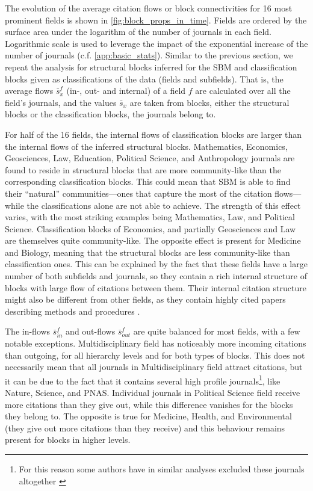\documentclass[a4paper,12pt]{article}
\begin{document}
The evolution of the average citation flows or block connectivities for 16 most prominent fields
is shown in \cref{fig:block_props_in_time}.
Fields are ordered by the surface area under the logarithm of the number of journals in each field.
Logarithmic scale is used to leverage the impact of the exponential increase of the number of journals (c.f. \cref{app:basic_stats}).
Similar to the previous section,
we repeat the analysis for structural blocks inferred for the SBM
and classification blocks given as classifications of the data (fields and subfields). That is, the average flows $\bar{s}^{f}_x$ (in-, out- and 
internal) of a field $f$ are calculated over all the field's journals, and the values $\bar{s}_x$ 
are taken from blocks,  either the structural blocks or the classification blocks, the journals belong to.

For half of the 16 fields, the internal flows of classification blocks are larger than the
internal flows of the inferred structural blocks.
Mathematics, Economics, Geosciences, Law, Education, Political Science, and Anthropology journals 
are found to reside in structural blocks that are more community-like than the corresponding classification blocks. This could mean that SBM is able to find their ``natural'' communities---ones 
that capture the most of the citation flows---while the classifications alone are not able to achieve.
The strength of this effect varies, with the most striking examples being Mathematics, Law, 
and Political Science. Classification blocks of Economics, and partially Geosciences and Law are 
themselves quite community-like.
The opposite effect is present for Medicine and Biology, meaning  that the structural blocks are less 
community-like than classification ones. 
This can be explained by the fact that these fields 
have a large number of both subfields and journals, so they contain a rich internal 
structure of blocks with large flow of citations between them.
Their internal citation structure might also be different from other fields, as they
contain highly cited papers describing methods and procedures \citep{Small1974}.

The in-flows $\bar{s}^{f}_{in}$ and out-flows $\bar{s}^{f}_{out}$ are quite balanced for most fields, with a few notable exceptions. 
Multidisciplinary field has noticeably more incoming citations than outgoing, for all hierarchy levels and for both types of blocks.
This does not necessarily mean that all journals in Multidisciplinary field attract 
citations, but it can be due to the fact that it contains several high profile
journals\footnote{For this reason some authors have in similar analyses excluded these journals altogether \citep{Zhang2010}},
like Nature, Science, and PNAS.
Individual journals in Political Science field receive more citations than they give out, 
while this difference vanishes for the blocks they belong to.
The opposite is true for Medicine, Health, and Environmental (they give out more citations than they receive) and this behaviour remains present for blocks in higher levels.
\end{document}
